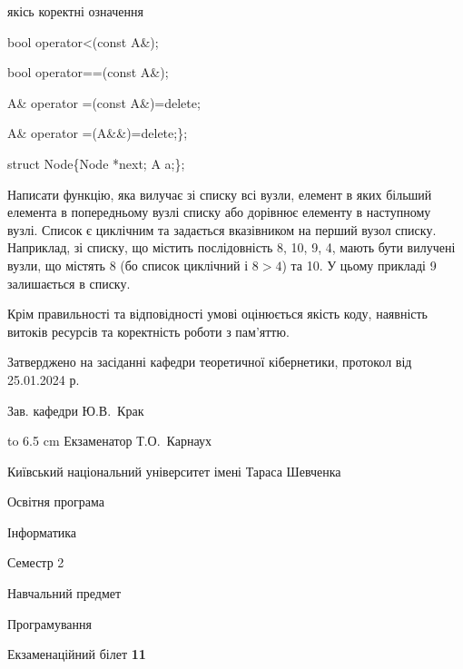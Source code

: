 \documentclass[12pt, ukrainian]{article}
\begin{document}
{\quad  якісь коректні означення 

\quad  bool operator<(const A\&); 

\quad  bool operator==(const A\&); 

\quad A\& operator =(const A\&)=delete; 

\quad  A\& operator =(A\&\&)=delete;\};

struct Node\{Node *next; A a;\};

 Написати функцію, яка вилучає зі списку всі вузли, елемент в яких більший елемента в попередньому вузлі списку або дорівнює елементу в наступному вузлі. Список є циклічним та задається вказівником на перший вузол списку. Наприклад, зі списку, що містить послідовність 8, 10, 9, 4, мають бути вилучені вузли, що містять 8 (бо список циклічний і $8>4$) та 10. У цьому прикладі 9 залишається в списку.

Крім правильності та відповідності умові оцінюється якість коду, наявність витоків ресурсів та коректність роботи з пам'яттю. 

}
{\smallskip\smallskip \begin {scriptsize} Затверджено на засіданні кафедри теоретичної кібернетики, протокол   від   25.01.2024 р.\par\smallskip\smallskip\smallskip\smallskip
{\parbox {6.5 cm} {Зав. кафедри \dotfill Ю.В.~Крак}}\hspace {0.7cm} {\hbox to 6.5 cm { Екзаменатор \dotfill Т.О.~Карнаух}} \end{scriptsize}}
\newpage
{{\begin {scriptsize}\par
{ \center  Київський національний університет імені Тараса Шевченка \par}
{\parbox {5 cm}{Освітня програма \hfill}{\parbox {7 cm}{Інформатика\hfill}}\parbox {6 cm}{\hfill Семестр 2}}\par
{\parbox {5 cm} {Навчальний предмет \hfill}\parbox {7 cm}{Програмування \hfill}\parbox {6cm}{\hfill}\par}\vspace{-15pt} \end{scriptsize}}{\center Екзаменаційний білет \No \textbf { 11 }\par}}
\end{document}
